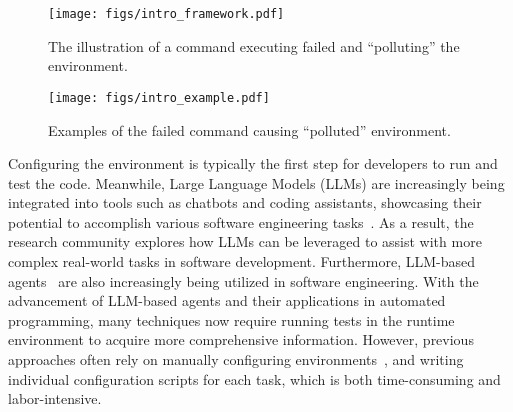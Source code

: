 \begin{figure}[t]
	\centering
	\texttt{[image: figs/intro\_framework.pdf]}
    \caption{The illustration of a command executing failed and ``polluting'' the environment.}
\label{figs:intro_framework}
\end{figure}

\begin{figure}[t]
	\centering
	\texttt{[image: figs/intro\_example.pdf]}
    \caption{Examples of the failed command causing ``polluted'' environment.}
\label{figs:intro_example}
\end{figure}


Configuring the environment is typically the first step for developers to run and test the code. Meanwhile, Large Language Models (LLMs) are increasingly being integrated into tools such as chatbots and coding assistants, showcasing their potential to accomplish various software engineering tasks~\cite{llm1, llm2, llm3}. As a result, the research community explores how LLMs can be leveraged to assist with more complex real-world tasks in software development. 
Furthermore, LLM-based agents~\cite{agent1, agent2, agent3} are also increasingly being utilized in software engineering.
With the advancement of LLM-based agents and their applications in automated programming, many techniques now require running tests in the runtime environment to acquire more comprehensive information. However, previous approaches often rely on manually configuring environments~\cite{jain2024r2e}, and writing individual configuration scripts for each task, which is both time-consuming and labor-intensive. 

